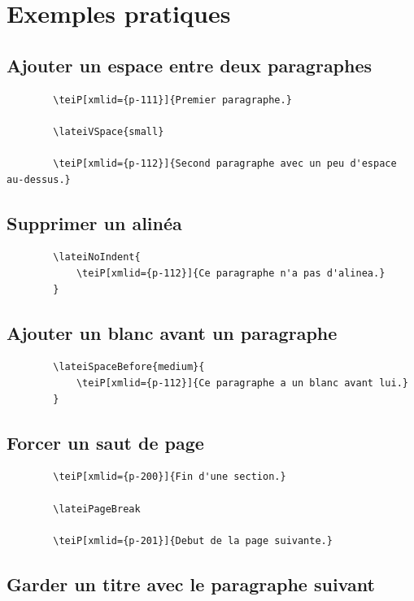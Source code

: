 \documentclass[11pt,a4paper]{article}
\begin{document}
	\section{Exemples pratiques}
	
	\subsection{Ajouter un espace entre deux paragraphes}
	
	\begin{lstlisting}
		\teiP[xmlid={p-111}]{Premier paragraphe.}
		
		\lateiVSpace{small}
		
		\teiP[xmlid={p-112}]{Second paragraphe avec un peu d'espace au-dessus.}
	\end{lstlisting}
	
	\subsection{Supprimer un alinéa}
	
	\begin{lstlisting}
		\lateiNoIndent{
			\teiP[xmlid={p-112}]{Ce paragraphe n'a pas d'alinea.}
		}
	\end{lstlisting}
	
	\subsection{Ajouter un blanc avant un paragraphe}
	
	\begin{lstlisting}
		\lateiSpaceBefore{medium}{
			\teiP[xmlid={p-112}]{Ce paragraphe a un blanc avant lui.}
		}
	\end{lstlisting}
	
	\subsection{Forcer un saut de page}
	
	\begin{lstlisting}
		\teiP[xmlid={p-200}]{Fin d'une section.}
		
		\lateiPageBreak
		
		\teiP[xmlid={p-201}]{Debut de la page suivante.}
	\end{lstlisting}
	
	\subsection{Garder un titre avec le paragraphe suivant}
	
\end{document}
